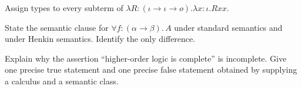 \begin{exercise}
\label{ex:simple-type-theory-01}
Assign types to every subterm of
\(\lambda R{:}(\iota\to\iota\to o).\lambda x{:}\iota.Rxx\).
\end{exercise}

\begin{exercise}
\label{ex:simple-type-theory-02}
State the semantic clause for \(\forall f{:}(\alpha\to\beta).\,A\) under
standard semantics and under Henkin semantics.  Identify the only difference.
\end{exercise}

\begin{exercise}
\label{ex:simple-type-theory-03}
Explain why the assertion ``higher-order logic is complete'' is incomplete.
Give one precise true statement and one precise false statement obtained by
supplying a calculus and a semantic class.
\end{exercise}

